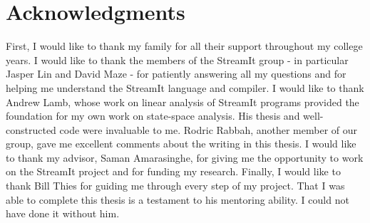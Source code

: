\cleardoublepage
\setcounter{savepage}{\thepage}
\begin{abstractpage}

\end{abstractpage}

% 

\cleardoublepage

\section*{Acknowledgments}

    First, I would like to thank my family for all their support throughout my college years.
I would like to thank the members of the StreamIt group - in particular Jasper Lin and David Maze - for patiently
answering all my questions and for helping me understand the StreamIt language and compiler. 
I would like to thank Andrew Lamb, whose work on linear analysis of StreamIt programs provided the foundation for 
my own work on state-space analysis. His thesis and well-constructed code were invaluable to me. Rodric Rabbah, another
member of our group, gave me excellent comments about the writing in this thesis.
I would like to thank my advisor, Saman Amarasinghe, for giving me the opportunity to work on the StreamIt project and for funding
my research. Finally, I would like to thank Bill Thies for guiding me through every step of my project. That
I was able to complete this thesis is a testament to his mentoring ability. I could not have done it without him.


